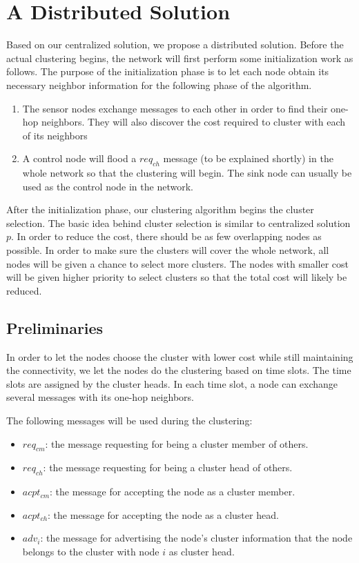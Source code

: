 \section{A Distributed Solution}
Based on our centralized solution, we propose a distributed solution. Before the actual clustering begins, the network will first perform some initialization work as follows. The purpose of the initialization phase is to let each node obtain its necessary neighbor information for the following phase of the algorithm.
\begin{enumerate}
\item The sensor nodes exchange messages to each other in order to find their one-hop neighbors. They will also discover the cost required to cluster with each of its neighbors
\item A control node will flood a \(req_{ch}\) message (to be explained shortly) in the whole network so that the clustering will begin. The sink node can usually be used as the control node in the network.
\end{enumerate}

After the initialization phase, our clustering algorithm begins the cluster selection. The basic idea behind cluster selection is similar to centralized solution \(p\). In order to reduce the cost, there should be as few overlapping nodes as possible. In order to make sure the clusters will cover the whole network, all nodes will be given a chance to select more clusters. The nodes with smaller cost will be given higher priority to select clusters so that the total cost will likely be reduced.

\subsection{Preliminaries}
In order to let the nodes choose the cluster with lower cost while still maintaining the connectivity, we let the nodes do the clustering based on time slots. The time slots are assigned by the cluster heads. In each time slot, a node can exchange several messages with its one-hop neighbors.

The following messages will be used during the clustering:
\begin{itemize}
\item \(req_{cm}\): the message requesting for being a cluster member of others. 
\item \(req_{ch}\): the message requesting for being a cluster head of others. 
\item \(acpt_{cm}\): the message for accepting the node as a cluster member.
\item \(acpt_{ch}\): the message for accepting the node as a cluster head.
\item \(adv_{i}\): the message for advertising the node's cluster information that the node belongs to the cluster with node \(i\) as cluster head.
\end{itemize}

